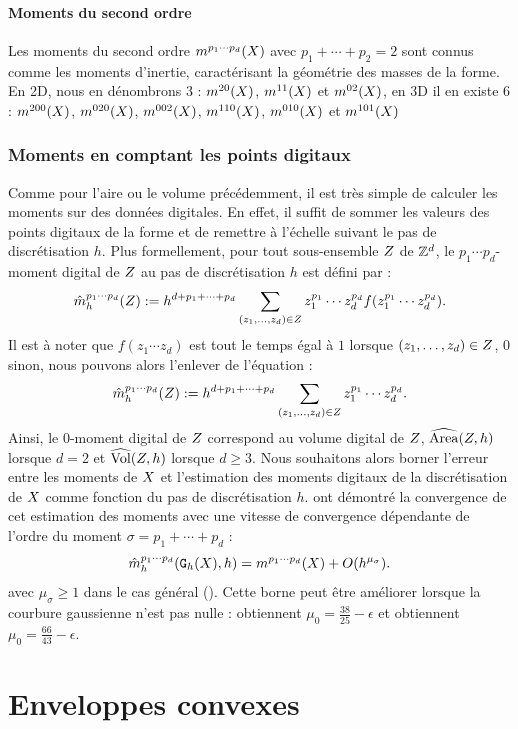 \paragraph{Moments du second ordre}
%
Les moments du second ordre $\Mom{p_1 \cdots p_d}(\Shape)$ avec $p_1 + \cdots +
p_2 = 2$ sont connus comme les moments d'inertie, caractérisant la géométrie des
masses de la forme. En 2D, nous en dénombrons 3 : $\Mom{2 0}(\Shape)$, $\Mom{1
1}(\Shape)$ et $\Mom{0 2}(\Shape)$, en 3D il en existe 6 :  $\Mom{2 0
0}(\Shape)$, $\Mom{0 2 0}(\Shape)$, $\Mom{0 0 2}(\Shape)$, $\Mom{1 1
0}(\Shape)$, $\Mom{0 1 0}(\Shape)$ et $\Mom{1 0 1}(\Shape)$
%
\subsubsection{Moments en comptant les points digitaux}
\label{sec:MomentsByCounting}
%
Comme pour l'aire ou le volume précédemment, il est très simple de calculer les
moments sur des données digitales. En effet, il suffit de sommer les valeurs des
points digitaux de la forme et de remettre à l'échelle suivant le pas de
discrétisation $h$. Plus formellement, pour tout sous-ensemble $\DigShape$ de
$\Z^d$, le $p_1 \cdots p_d$-moment digital de $\DigShape$ au pas de
discrétisation $h$ est défini par :
%
\begin{equation}
  \DMom{p_1 \cdots p_d}{h}(\DigShape) \EqDef h^{d + p_1 + \cdots + p_d} \sum_{(z_1,\ldots,z_d) \in \DigShape} z_1^{p_1} \cdots z_d^{p_d} f(z_1^{p_1} \cdots z_d^{p_d}).
\end{equation}
%
Il est à noter que $f(z_1 \cdots z_d)$ est tout le temps égal à $1$ lorsque
$(z_1,\ldots,z_d) \in \DigShape$, $0$ sinon, nous pouvons alors l'enlever de
l'équation :
%
\begin{equation} \label{eq:MomentsByCounting-def}
%
  \DMom{p_1 \cdots p_d}{h}(\DigShape) \EqDef h^{d + p_1 + \cdots + p_d} \sum_{(z_1,\ldots,z_d) \in \DigShape} z_1^{p_1} \cdots z_d^{p_d}.
%
\end{equation}
%
Ainsi, le $0$-moment digital de $\DigShape$ correspond au volume digital de
$\DigShape$, \cad $\AreaC(\DigShape,h)$ lorsque $d = 2$ et $\VolC(\DigShape,h)$
lorsque $d \geq 3$.
%
Nous souhaitons alors borner l'erreur entre les moments de $\Shape$ et
l'estimation des moments digitaux de la discrétisation de $\Shape$ comme
fonction du pas de discrétisation $h$.  ont
démontré la convergence de cet estimation des moments avec une vitesse de
convergence dépendante de l'ordre du moment $\sigma = p_1 + \cdots + p_d$ :
%
\begin{equation} \label{eq:MomentsByCounting-conv}
%
  \DMom{p_1 \cdots p_d}{h}(\DigF{\Shape}{h},h) = \Mom{p_1 \cdots p_d}(\Shape) + O(h^{\mu_{\sigma}}).
%
\end{equation}
%
avec $\mu_{\sigma} \ge 1$ dans le cas général (). Cette
borne peut être améliorer lorsque la courbure gaussienne n'est pas nulle :
 obtiennent $\mu_0=\frac{38}{25}-\epsilon$ et
 obtiennent $\mu_0 = \frac{66}{43}-\epsilon$.
%
\section{Enveloppes convexes}
%
